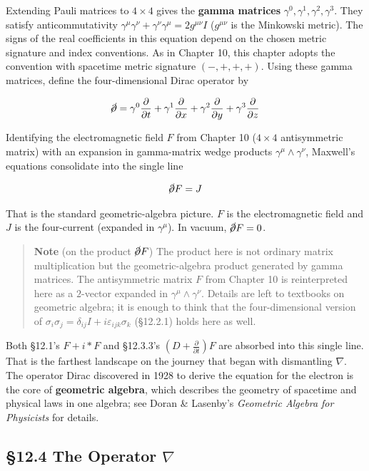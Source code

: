 \documentclass[a4paper,12pt,openany]{book}
\begin{document}
Extending Pauli matrices to \(4\times4\) gives the \textbf{gamma
matrices} \(\gamma^0,\gamma^1,\gamma^2,\gamma^3\). They satisfy
anticommutativity
\(\gamma^\mu\gamma^\nu + \gamma^\nu\gamma^\mu = 2g^{\mu\nu}I\)
(\(g^{\mu\nu}\) is the Minkowski metric). The signs of the real
coefficients in this equation depend on the chosen metric signature and
index conventions. As in Chapter 10, this chapter adopts the convention
with spacetime metric signature \((-,+,+,+)\). Using these gamma
matrices, define the four-dimensional Dirac operator by

\[\cancel{\partial} = \gamma^0\frac{\partial}{\partial t} + \gamma^1\frac{\partial}{\partial x} + \gamma^2\frac{\partial}{\partial y} + \gamma^3\frac{\partial}{\partial z}\]

Identifying the electromagnetic field \(F\) from Chapter 10
(\(4\times4\) antisymmetric matrix) with an expansion in gamma-matrix
wedge products \(\gamma^\mu\!\wedge\!\gamma^\nu\), Maxwell's equations
consolidate into the single line

\[\cancel{\partial} F = J\]

That is the standard geometric-algebra picture. \(F\) is the
electromagnetic field and \(J\) is the four-current (expanded in
\(\gamma^\mu\)). In vacuum, \(\cancel{\partial} F = 0\).

\begin{quote}
\textbf{Note} (on the product \(\cancel{\partial} F\)) The product here
is not ordinary matrix multiplication but the geometric-algebra product
generated by gamma matrices. The antisymmetric matrix \(F\) from Chapter
10 is reinterpreted here as a \(2\)-vector expanded in
\(\gamma^\mu\!\wedge\!\gamma^\nu\). Details are left to textbooks on
geometric algebra; it is enough to think that the four-dimensional
version of
\(\sigma_i\sigma_j = \delta_{ij}I + i\varepsilon_{ijk}\sigma_k\)
(§12.2.1) holds here as well.
\end{quote}

Both §12.1's \(F + i\ast F\) and §12.3.3's
\((D + \frac{\partial}{\partial t})F\) are absorbed into this single
line. That is the farthest landscape on the journey that began with
dismantling \(\nabla\). The operator Dirac discovered in 1928 to derive
the equation for the electron is the core of \textbf{geometric algebra},
which describes the geometry of spacetime and physical laws in one
algebra; see Doran \& Lasenby's \emph{Geometric Algebra for Physicists}
for details.

\hypertarget{the-operator-nabla}{%
\subsection{\texorpdfstring{§12.4 The Operator
\(\nabla\)}{§12.4 The Operator \textbackslash nabla}}\label{the-operator-nabla}}
\end{document}
